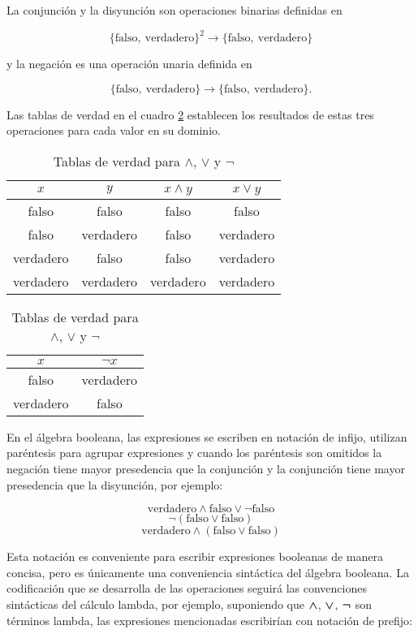 La conjunción y la disyunción son operaciones binarias definidas en

\[ \{ \mathrm{falso},\ \mathrm{verdadero} \}^{2} \to \{ \mathrm{falso},\ \mathrm{verdadero} \} \]

y la negación es una operación unaria definida en

\[ \{ \mathrm{falso},\ \mathrm{verdadero} \} \to \{ \mathrm{falso},\ \mathrm{verdadero} \}. \]

Las tablas de verdad en el cuadro \ref{tab:and-or-not} establecen los resultados de estas tres operaciones para cada valor en su dominio.

\begin{table}[h!]
  \centering
  \small
  \begin{tabular}{|c|c|c|c|}
    \hline
    \( x \) & \( y \) & \( x \land y \) & \( x \lor y \) \\ [0.5ex]
    \hline\hline
    falso & falso & falso & falso \\
    falso & verdadero & falso & verdadero \\
    verdadero & falso & falso & verdadero \\
    verdadero & verdadero & verdadero & verdadero \\
    \hline
  \end{tabular}
  \hfill
  \begin{tabular}{|c|c|}
    \hline
    \( x \) & \( \lnot x \) \\ [0.5ex]
    \hline\hline
    falso & verdadero  \\
    verdadero & falso \\
    \hline
  \end{tabular}
  \caption{Tablas de verdad para \( \land \), \( \lor \) y \( \lnot \)}
  \label{tab:and-or-not}
\end{table}

En el álgebra booleana, las expresiones se escriben en notación de infijo, utilizan paréntesis para agrupar expresiones y cuando los paréntesis son omitidos la negación tiene mayor presedencia que la conjunción y la conjunción tiene mayor presedencia que la disyunción, por ejemplo:

\[ \mathrm{verdadero} \land \mathrm{falso} \lor \lnot \mathrm{falso} \]
\[ \lnot (\mathrm{falso} \lor \mathrm{falso}) \]
\[ \mathrm{verdadero} \land (\mathrm{falso} \lor \mathrm{falso}) \]

Esta notación es conveniente para escribir expresiones booleanas de manera concisa, pero es únicamente una conveniencia sintáctica del álgebra booleana. La codificación que se desarrolla de las operaciones seguirá las convenciones sintácticas del cálculo lambda, por ejemplo, suponiendo que \( \boldsymbol{\land} \), \( \boldsymbol{\lor} \), \( \boldsymbol{\lnot} \) son términos lambda, las expresiones mencionadas escribirían con notación de prefijo:

